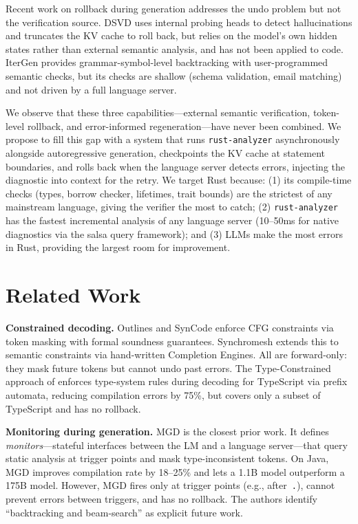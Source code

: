 \documentclass[11pt,letterpaper]{article}
\begin{document}
Recent work on rollback during generation addresses the undo problem but not the verification source. DSVD \citep{guo2025dsvd} uses internal probing heads to detect hallucinations and truncates the KV cache to roll back, but relies on the model's own hidden states rather than external semantic analysis, and has not been applied to code. IterGen \citep{park2025itergen} provides grammar-symbol-level backtracking with user-programmed semantic checks, but its checks are shallow (schema validation, email matching) and not driven by a full language server.

We observe that these three capabilities---external semantic verification, token-level rollback, and error-informed regeneration---have never been combined. We propose to fill this gap with a system that runs \texttt{rust-analyzer} asynchronously alongside autoregressive generation, checkpoints the KV cache at statement boundaries, and rolls back when the language server detects errors, injecting the diagnostic into context for the retry. We target Rust because: (1) its compile-time checks (types, borrow checker, lifetimes, trait bounds) are the strictest of any mainstream language, giving the verifier the most to catch; (2) \texttt{rust-analyzer} has the fastest incremental analysis of any language server (10--50ms for native diagnostics via the salsa query framework); and (3) LLMs make the most errors in Rust, providing the largest room for improvement.

\section{Related Work}

\textbf{Constrained decoding.}
Outlines \citep{willard2023outlines} and SynCode \citep{ugare2024syncode} enforce CFG constraints via token masking with formal soundness guarantees. Synchromesh \citep{poesia2022synchromesh} extends this to semantic constraints via hand-written Completion Engines. All are forward-only: they mask future tokens but cannot undo past errors. The Type-Constrained approach of \citet{mundler2025typeconstrained} enforces type-system rules during decoding for TypeScript via prefix automata, reducing compilation errors by 75\%, but covers only a subset of TypeScript and has no rollback.

\textbf{Monitoring during generation.}
MGD \citep{agrawal2023mgd} is the closest prior work. It defines \emph{monitors}---stateful interfaces between the LM and a language server---that query static analysis at trigger points and mask type-inconsistent tokens. On Java, MGD improves compilation rate by 18--25\% and lets a 1.1B model outperform a 175B model. However, MGD fires only at trigger points (e.g., after~\texttt{.}), cannot prevent errors between triggers, and has no rollback. The authors identify ``backtracking and beam-search'' as explicit future work.
\end{document}
